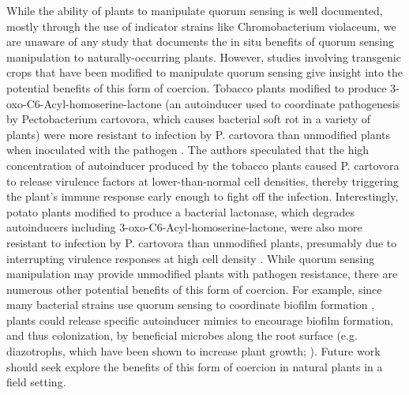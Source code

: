 While the ability of plants to manipulate quorum sensing is well documented, mostly through the use of indicator strains like Chromobacterium violaceum, we are unaware of any study that documents the in situ benefits of quorum sensing manipulation to naturally-occurring plants. However, studies involving transgenic crops that have been modified to manipulate quorum sensing give insight into the potential benefits of this form of coercion. Tobacco plants modified to produce 3-oxo-C6-Acyl-homoserine-lactone (an autoinducer used to coordinate pathogenesis by Pectobacterium cartovora, which causes bacterial soft rot in a variety of plants) were more resistant to infection by P. cartovora than unmodified plants when inoculated with the pathogen  \parencite{mae2001}. The authors speculated that the high concentration of autoinducer produced by the tobacco plants caused P. cartovora to release virulence factors at lower-than-normal cell densities, thereby triggering the plant’s immune response early enough to fight off the infection. Interestingly, potato plants modified to produce a bacterial lactonase, which degrades autoinducers including 3-oxo-C6-Acyl-homoserine-lactone, were also more resistant to infection by P. cartovora than unmodified plants, presumably due to interrupting virulence responses at high cell density  \parencite{dong2001}. While quorum sensing manipulation may provide unmodified plants with pathogen resistance, there are numerous other potential benefits of this form of coercion. For example, since many bacterial strains use quorum sensing to coordinate biofilm formation  \parencite{bassler1999}, plants could release specific autoinducer mimics to encourage biofilm formation, and thus colonization, by beneficial microbes along the root surface (e.g. diazotrophs, which have been shown to increase plant growth; \parencite{norman2017}). Future work should seek explore the benefits of this form of coercion in natural plants in a field setting.

